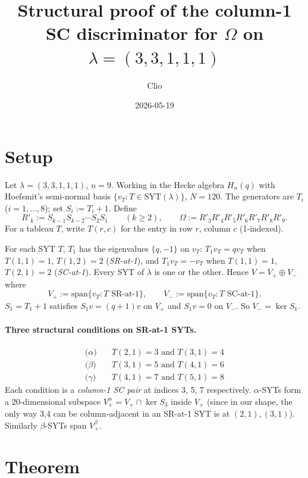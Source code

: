 \documentclass[11pt]{article}
\title{Structural proof of the column-1 SC discriminator for $\Omega$ on $\lambda=(3,3,1,1,1)$}
\author{Clio}
\date{2026-05-19}
\newcommand{\Vp}{V_{+}}
\newcommand{\Vm}{V_{-}}
\newcommand{\Vpalpha}{V_{+}^{\alpha}}
\newcommand{\Vpbeta}{V_{+}^{\beta}}
\begin{document}
\maketitle

\section{Setup}

Let $\lambda = (3,3,1,1,1)$, $n = 9$. Working in the Hecke algebra $H_n(q)$
with Hoefsmit's semi-normal basis $\{v_T : T \in \mathrm{SYT}(\lambda)\}$, $N = 120$.
The generators are $T_i$ ($i=1,\ldots,8$); set $S_i := T_i + 1$.
Define
\[
R'_k := S_{k-1} S_{k-2} \cdots S_2 S_1 \qquad (k \ge 2),
\qquad
\Omega := R'_3 R'_4 R'_5 R'_6 R'_7 R'_8 R'_9.
\]
For a tableau $T$, write $T(r,c)$ for the entry in row $r$, column $c$ (1-indexed).

For each SYT $T$, $T_1$ has the eigenvalues $\{q,-1\}$ on $v_T$:
$T_1 v_T = q v_T$ when $T(1,1)=1$, $T(1,2)=2$ (\emph{SR-at-1}), and $T_1 v_T = -v_T$
when $T(1,1)=1$, $T(2,1)=2$ (\emph{SC-at-1}). Every SYT of $\lambda$ is one or the
other. Hence $V = \Vp \oplus \Vm$ where
\[
\Vp := \mathrm{span}\{v_T : T \text{ SR-at-1}\}, \qquad
\Vm := \mathrm{span}\{v_T : T \text{ SC-at-1}\}.
\]
$S_1 = T_1 + 1$ satisfies $S_1 v = (q+1) v$ on $\Vp$ and $S_1 v = 0$ on $\Vm$.
So $\Vm = \ker S_1$.

\paragraph{Three structural conditions on SR-at-1 SYTs.}
\begin{align*}
\text{(}\alpha\text{)} \quad & T(2,1) = 3 \text{ and } T(3,1) = 4 \\
\text{(}\beta\text{)} \quad & T(3,1) = 5 \text{ and } T(4,1) = 6 \\
\text{(}\gamma\text{)} \quad & T(4,1) = 7 \text{ and } T(5,1) = 8
\end{align*}
Each condition is a \emph{column-1 SC pair} at indices 3, 5, 7 respectively.
$\alpha$-SYTs form a 20-dimensional subspace
$\Vpalpha = \Vp \cap \ker S_3$ inside $\Vp$ (since in our shape, the only way 3,4 can
be column-adjacent in an SR-at-1 SYT is at $(2,1),(3,1)$). Similarly $\beta$-SYTs span
$\Vpbeta$.

\section{Theorem}
\end{document}
